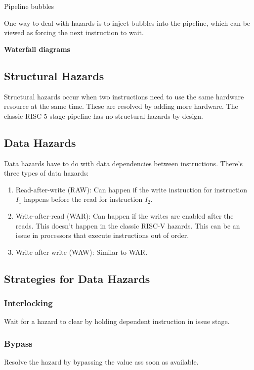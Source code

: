 Pipeline bubbles

One way to deal with hazards is to inject bubbles into the pipeline, which can be viewed as forcing the next instruction to wait.

\textbf{Waterfall diagrams}

\subsection{Structural Hazards}
Structural hazards occur when two instructions need to use the same hardware resource at the same time.
These are resolved by adding more hardware.
The classic RISC 5-stage pipeline has no structural hazards by design.

\subsection{Data Hazards}
Data hazards have to do with data dependencies between instructions.
There's three types of data hazards:

\begin{enumerate}
    \item Read-after-write (RAW): Can happen if the write instruction for instruction $I_1$ happens before the read for instruction $I_2$.
    \item Write-after-read (WAR): Can happen if the writes are enabled after the reads.
    This doesn't happen in the classic RISC-V hazards.
    This can be an issue in processors that execute instructions out of order.
    \item Write-after-write (WAW): Similar to WAR.
\end{enumerate}

\subsection{Strategies for Data Hazards}

\subsubsection{Interlocking}
Wait for a hazard to clear by holding dependent instruction in issue stage.

\subsubsection{Bypass}
Resolve the hazard by bypassing the value ass soon as available.

